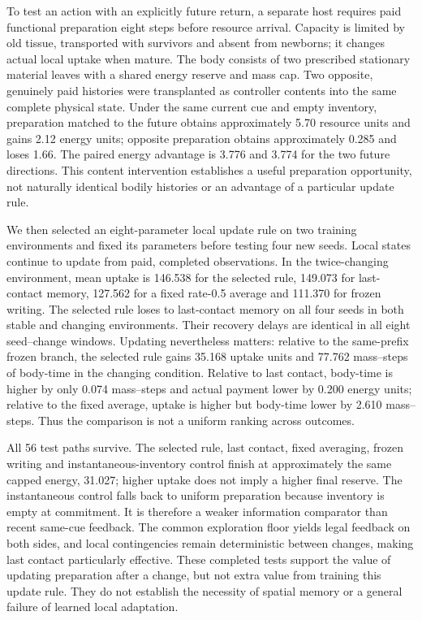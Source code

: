 To test an action with an explicitly future return, a separate host requires paid functional preparation eight steps before resource arrival. Capacity is limited by old tissue, transported with survivors and absent from newborns; it changes actual local uptake when mature. The body consists of two prescribed stationary material leaves with a shared energy reserve and mass cap. Two opposite, genuinely paid histories were transplanted as controller contents into the same complete physical state. Under the same current cue and empty inventory, preparation matched to the future obtains approximately 5.70 resource units and gains 2.12 energy units; opposite preparation obtains approximately 0.285 and loses 1.66. The paired energy advantage is 3.776 and 3.774 for the two future directions. This content intervention establishes a useful preparation opportunity, not naturally identical bodily histories or an advantage of a particular update rule.

We then selected an eight-parameter local update rule on two training environments and fixed its parameters before testing four new seeds. Local states continue to update from paid, completed observations. In the twice-changing environment, mean uptake is 146.538 for the selected rule, 149.073 for last-contact memory, 127.562 for a fixed rate-0.5 average and 111.370 for frozen writing. The selected rule loses to last-contact memory on all four seeds in both stable and changing environments. Their recovery delays are identical in all eight seed--change windows. Updating nevertheless matters: relative to the same-prefix frozen branch, the selected rule gains 35.168 uptake units and 77.762 mass--steps of body-time in the changing condition. Relative to last contact, body-time is higher by only 0.074 mass--steps and actual payment lower by 0.200 energy units; relative to the fixed average, uptake is higher but body-time lower by 2.610 mass--steps. Thus the comparison is not a uniform ranking across outcomes.

All 56 test paths survive. The selected rule, last contact, fixed averaging, frozen writing and instantaneous-inventory control finish at approximately the same capped energy, 31.027; higher uptake does not imply a higher final reserve. The instantaneous control falls back to uniform preparation because inventory is empty at commitment. It is therefore a weaker information comparator than recent same-cue feedback. The common exploration floor yields legal feedback on both sides, and local contingencies remain deterministic between changes, making last contact particularly effective. These completed tests support the value of updating preparation after a change, but not extra value from training this update rule. They do not establish the necessity of spatial memory or a general failure of learned local adaptation.

